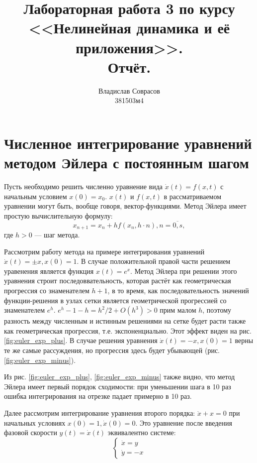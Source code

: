 \documentclass[a4paper]{article}
\begin{document}
\title{Лабораторная работа 3 по курсу <<Нелинейная динамика и её приложения>>. \\Отчёт.}
\author{Владислав Соврасов\\ 381503м4}
\date{}
\maketitle

\section{Численное интегрирование уравнений методом Эйлера с постоянным шагом}
Пусть необходимо решить численно уравнение вида \(\dot x(t)=f(x,t)\) с начальным
условием \(x(0)=x_0\). \(x(t)\) и \(f(x,t)\) в рассматриваемом уравнении могут быть,
вообще говоря, вектор-функциями. Метод Эйлера имеет простую вычислительную формулу:
\begin{displaymath}
	x_{n+1}=x_n+hf(x_n, h\cdot n),n=\overline{0,s},
\end{displaymath}
где \(h>0\) --- шаг метода.

Рассмотрим работу метода на примере интегрирования уравнений \(\dot x(t) = \pm x, x(0)=1\).
В случае положительной правой части решением уравенения является функция \(x(t)=e^x\).
Метод Эйлера при решении этого уравнения строит последоввательность, которая растёт
как геометрическая прогрессия со знаменателем \(h+1\), в то время, как
последовательность значений функции-решения в узлах сетки является
геометрической прогрессией со знаменателем \(e^h\). \(e^h - 1 - h = h^2/2 + O(h^3)>0\)
прим малом \(h\), поэтому разность между численным и истинным решениями на сетке
будет расти также как геометрическая прогрессия, т.е. экспоненциально. Этот эффект
виден на рис. \ref{fig:euler_exp_plus}.
В случае решения уравнения \(\dot x(t) = - x, x(0)=1\) верны те же самые рассуждения,
но прогрессия здесь будет убывающей (рис. \ref{fig:euler_exp_minus}).

Из рис. \ref{fig:euler_exp_plus}, \ref{fig:euler_exp_minus} также видно, что метод
Эйлера имеет первый порядок сходимости: при уменьшении шага в 10 раз ошибка интегрирования
на отрезке падает примерно в 10 раз.

Далее рассмотрим интегрирование уравнения второго порядка: \(\ddot x + x=0\) при
начальных условиях \(x(0)=1,\dot x(0)=0\). Это уравнение после введения фазовой скорости
\(y(t)=\dot x(t)\) эквивалентно системе:
\begin{displaymath}
	\left\{
  \begin{array}{lr}
    \dot x = y\\
    \dot y = -x
  \end{array}
\right.
\end{displaymath}
\end{document}
